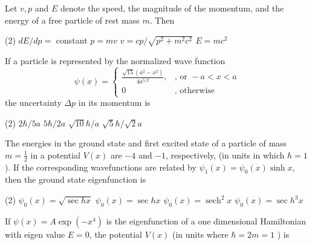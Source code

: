 \begin{enumerate}
	\begin{minipage}{\textwidth}
		\item Let $v, p$ and $E$ denote the speed, the magnitude of the momentum, and the energy of a free particle of rest mass $m$. Then
	\end{minipage}
	\begin{tasks}(2)
		\task[\textbf{A.}] $d E / d p=$ constant
		\task[\textbf{B.}]$p=m v$
		\task[\textbf{C.}]$v=c p / \sqrt{p^{2}+m^{2} c^{2}}$
		\task[\textbf{D.}] $E=m c^{2}$
	\end{tasks}
\begin{minipage}{\textwidth}
	\item If a particle is represented by the normalized wave function
	$$
	\psi(x)= \begin{cases}\frac{\sqrt{15}\left(a^{2}-x^{2}\right)}{4 a^{5 / 2}}, & \text {, or }-a<x<a \\ 0 & , \text { otherwise }\end{cases}
	$$
	the uncertainty $\Delta p$ in its momentum is
\end{minipage}
\begin{tasks}(2)
	\task[\textbf{A.}] $2 \hbar / 5 a$
	\task[\textbf{B.}] $5 \hbar / 2 a$
	\task[\textbf{C.}]$\sqrt{10} \hbar / a$
	\task[\textbf{D.}]$\sqrt{5} \hbar / \sqrt{2} a$
\end{tasks}
	\begin{minipage}{\textwidth}
		\item The energies in the ground state and first excited state of a particle of mass $m=\frac{1}{2}$ in a potential $V(x)$ are $-4$ and $-1$, respectively, (in units in which $\hbar=1$ ). If the corresponding wavefunctions are related by $\psi_{1}(x)=\psi_{0}(x) \sinh x$, then the ground state eigenfunction is
	\end{minipage}
	\begin{tasks}(2)
		\task[\textbf{A.}] $\psi_{0}(x)=\sqrt{\sec h x}$
		\task[\textbf{B.}]$\psi_{0}(x)=\sec h x$
		\task[\textbf{C.}]$\psi_{0}(x)=\operatorname{sech}^{2} x$
		\task[\textbf{D.}]$\psi_{0}(x)=\sec h^{3} x$
	\end{tasks}
\begin{minipage}{\textwidth}
	\item If $\psi(x)=A \exp \left(-x^{4}\right)$ is the eigenfunction of a one dimensional Hamiltonian with eigen value $E=0$, the potential $V(x)$ (in units where $\hbar=2 m=1$ ) is

\end{minipage}
\end{enumerate}
